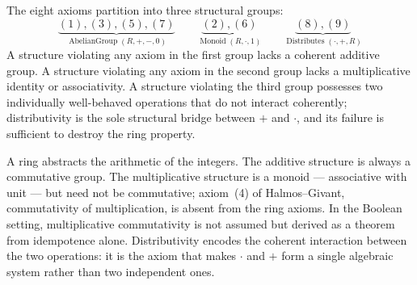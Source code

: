 \begin{remark*}
The eight axioms partition into three structural groups:
\[
\underbrace{(1),(3),(5),(7)}_{\displaystyle\operatorname{AbelianGroup}(R,+,-,0)}
\qquad
\underbrace{(2),(6)}_{\displaystyle\operatorname{Monoid}(R,\cdot,1)}
\qquad
\underbrace{(8),(9)}_{\displaystyle\operatorname{Distributes}(\cdot,+,R)}
\]
A structure violating any axiom in the first group lacks a coherent
additive group.
A structure violating any axiom in the second group lacks a
multiplicative identity or associativity.
A structure violating the third group possesses two individually
well-behaved operations that do not interact coherently;
distributivity is the sole structural bridge between $+$ and
$\cdot$, and its failure is sufficient to destroy the ring property.
\end{remark*}

\begin{remark*}[Interpretation]
A ring abstracts the arithmetic of the integers.
The additive structure is always a commutative group.
The multiplicative structure is a monoid --- associative with
unit --- but need not be commutative; axiom~(4) of
Halmos--Givant, commutativity of multiplication, is absent from
the ring axioms.
In the Boolean setting, multiplicative commutativity is not
assumed but derived as a theorem from idempotence alone.
Distributivity encodes the coherent interaction between the
two operations: it is the axiom that makes $\cdot$ and $+$
form a single algebraic system rather than two independent ones.
\end{remark*}

\NoLocalDependencies
